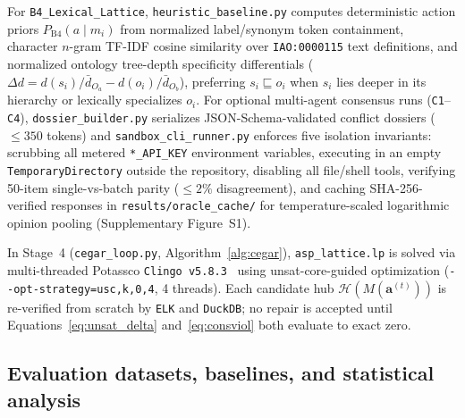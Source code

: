 \documentclass[10pt]{article}
\theoremstyle{accentdef}
\begin{document}
For \texttt{B4\_Lexical\_Lattice}, \texttt{heuristic\_baseline.py} computes deterministic action priors $P_{\mathrm{B4}}(a \mid m_i)$ from normalized label/synonym token containment, character $n$-gram TF-IDF cosine similarity over \texttt{IAO:0000115} text definitions, and normalized ontology tree-depth specificity differentials ($\Delta d = d(s_i)/\bar{d}_{O_a} - d(o_i)/\bar{d}_{O_b}$), preferring $s_i \sqsubseteq o_i$ when $s_i$ lies deeper in its hierarchy or lexically specializes $o_i$. For optional multi-agent consensus runs (\texttt{C1}--\texttt{C4}), \texttt{dossier\_builder.py} serializes JSON-Schema-validated conflict dossiers ($\le 350$ tokens) and \texttt{sandbox\_cli\_runner.py} enforces five isolation invariants: scrubbing all metered \texttt{*\_API\_KEY} environment variables, executing in an empty \texttt{TemporaryDirectory} outside the repository, disabling all file/shell tools, verifying 50-item single-vs-batch parity ($\le 2\%$ disagreement), and caching SHA-256-verified responses in \texttt{results/oracle\_cache/} for temperature-scaled logarithmic opinion pooling (Supplementary Figure~S1).

In Stage~4 (\texttt{cegar\_loop.py}, Algorithm~\ref{alg:cegar}), \texttt{asp\_lattice.lp} is solved via multi-threaded Potassco \texttt{Clingo~v5.8.3}~\cite{gebser2019clingo} using unsat-core-guided optimization (\texttt{-{}-opt-strategy=usc,k,0,4}, 4 threads). Each candidate hub $\mathcal{H}(M(\mathbf{a}^{(t)}))$ is re-verified from scratch by \texttt{ELK} and \texttt{DuckDB}; no repair is accepted until Equations~\eqref{eq:unsat_delta} and~\eqref{eq:consviol} both evaluate to exact zero.

\subsection*{Evaluation datasets, baselines, and statistical analysis}
\end{document}
